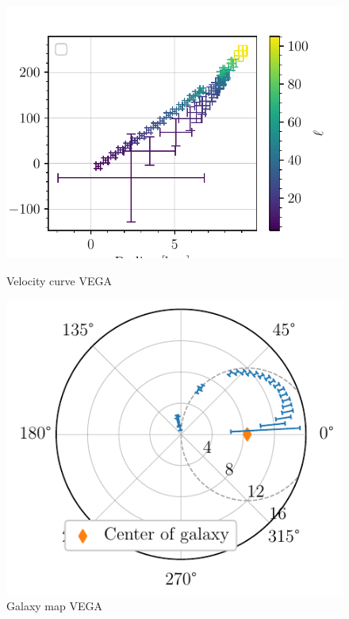 \begin{figure}[htbp]
    \begin{minipage}[t]{0.5\textwidth}
        \centering
        \captionsetup{width=.9\textwidth}
        \includegraphics[scale=1]{figures/VEGA_velocity_curve.pdf}
        \caption{Velocity curve VEGA}
        \label{fig:VEGA_velocity_curve}
    \end{minipage}
    \begin{minipage}[t]{0.5\textwidth}
        \centering
        \captionsetup{width=.9\textwidth}
        \includegraphics[scale=1]{figures/VEGA_galaxy_map.pdf}
        \caption{Galaxy map VEGA}
        \label{fig:VEGA_galaxy_map}
    \end{minipage}
\end{figure}

